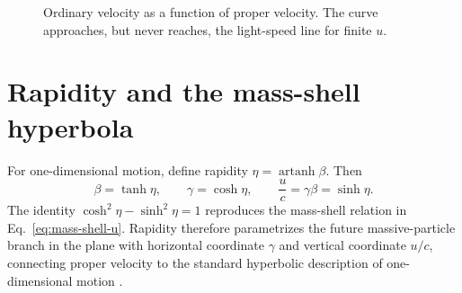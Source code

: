 \documentclass[12pt]{article}
\begin{document}
\begin{figure}[ht]
  \centering
  \caption{Ordinary velocity as a function of proper velocity. The curve approaches, but never reaches, the light-speed line for finite $u$.}
  \label{fig:velocity-map}
\end{figure}

\section{Rapidity and the mass-shell hyperbola}
\label{sec:rapidity}

For one-dimensional motion, define rapidity $\eta=\operatorname{artanh}\beta$. Then
\begin{equation}
  \beta=\tanh\eta,
  \qquad
  \gamma=\cosh\eta,
  \qquad
  \frac{u}{c}=\gamma\beta=\sinh\eta.
  \label{eq:rapidity-relations}
\end{equation}
The identity $\cosh^2\eta-\sinh^2\eta=1$ reproduces the mass-shell relation in Eq.~\eqref{eq:mass-shell-u}. Rapidity therefore parametrizes the future massive-particle branch in the plane with horizontal coordinate $\gamma$ and vertical coordinate $u/c$, connecting proper velocity to the standard hyperbolic description of one-dimensional motion \cite{Tong}.
\end{document}
